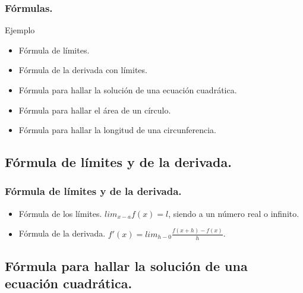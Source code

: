 \documentclass{beamer}
\begin{document}
\begin{frame}

\frametitle{Fórmulas.}

\begin{block}{Ejemplo}
  \begin{itemize}
  \item
  Fórmula de límites. 
  \pause

  \item
  Fórmula de la derivada con límites.
  \pause

  \item
  Fórmula para hallar la solución de una ecuación cuadrática.
  \pause

  \item
  Fórmula para hallar el área de un círculo.
  \pause

  \item
  Fórmula para hallar la longitud de una circunferencia.

  \end{itemize}
\end{block}

\end{frame}

  \subsection{Fórmula de límites y de la derivada.}

\begin{frame}
\frametitle{Fórmula de límites y de la derivada.}
\begin{itemize}
  \item
  Fórmula de los límites.\newline
  $lim_{x-a} f(x) = l$, siendo a un número real o infinito.\newline
  
  \item
  Fórmula de la derivada.\newline
  $f'(x)=lim_{h-0} \frac{f(x+h)-f(x)}{h}$.
\end{itemize}
\end{frame}

  \subsection{Fórmula para hallar la solución de una ecuación cuadrática.}
\end{document}
